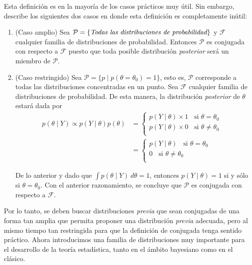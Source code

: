 Esta definición es en la mayoría de los casos prácticos muy útil. Sin embargo,  describe los siguientes dos casos en donde esta definición es completamente inútil:

\begin{enumerate}
\item (Caso amplio) Sea $\mathcal{P}=\{\emph{Todas las distribuciones de probabilidad}\}$ y $\mathcal{F}$ cualquier familia de distribuciones de probabilidad. Entonces $\mathcal{P}$ es conjugada con respecto a $\mathcal{F}$ puesto que toda posible distribución \emph{posterior} será un miembro de $\mathcal{P}$.
\item (Caso restringido) Sea $\mathcal{P}=\{p  \mid  p(\theta=\theta_0)=1\}$, esto es, $\mathcal{P}$ corresponde a todas las distribuciones concentradas en un punto. Sea $\mathcal{F}$ cualquier familia de distribuciones de probabilidad. De esta manera, la distribución \emph{posterior} de $\theta$ estará dada por
    \begin{align*}
    p(\theta \mid Y)\propto
    p(Y \mid \theta)p(\theta)
    &=
    \begin{cases}
    p(Y \mid \theta)\times 1 \ \ \ \ \text{si $\theta=\theta_0$}\\
    p(Y \mid \theta)\times 0 \ \ \ \ \text{si $\theta\neq\theta_0$}\\
    \end{cases}\\
    &=
    \begin{cases}
    p(Y \mid \theta) \ \ \ \ \text{si $\theta=\theta_0$}\\
    0           \ \ \ \ \text{si $\theta\neq\theta_0$}\\
    \end{cases}
    \end{align*}

    De lo anterior y dado que $\int p(\theta \mid Y)\ d\theta=1$, entonces $p(Y \mid \theta)=1$ si y sólo si $\theta=\theta_0$. Con el anterior razonamiento, se concluye que $\mathcal{P}$ es conjugada con respecto a $\mathcal{F}$.
\end{enumerate}

Por lo tanto, se deben buscar distribuciones \emph{previa} que sean conjugadas de una forma tan amplia que permita proponer una distribución \emph{previa} adecuada, pero al mismo tiempo tan restringida para que la definición de conjugada tenga sentido práctico. Ahora introducimos una familia de distribuciones muy importante para el desarrollo de la teoría estadística, tanto en el ámbito bayesiano como en el clásico.

